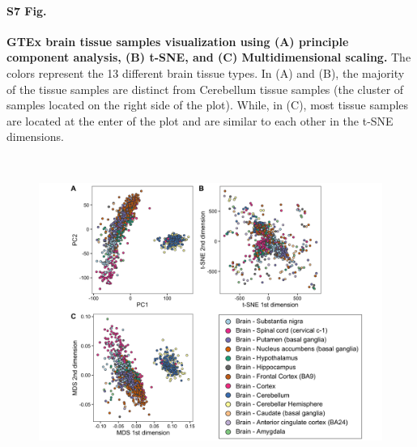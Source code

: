 \documentclass[10pt,letterpaper]{article}
\begin{document}
\paragraph*{S7 Fig.}

\label{figS7}
{\bf GTEx brain tissue samples visualization using (A) principle component analysis, (B) t-SNE, and (C) Multidimensional scaling.}
The colors represent the 13 different brain tissue types. In (A) and (B), the majority of the tissue samples are distinct from Cerebellum tissue samples (the cluster of samples located on the right side of the plot). While, in (C), most tissue samples are located at the enter of the plot and are similar to each other in the t-SNE dimensions.

\begin{figure}[ht]
\centering
\includegraphics[height=4in, width=6in]{../../src/figure/gtex-brain-other-methods.Rmd/gtex-brain-with-legend.png}
\end{figure}
\end{document}
